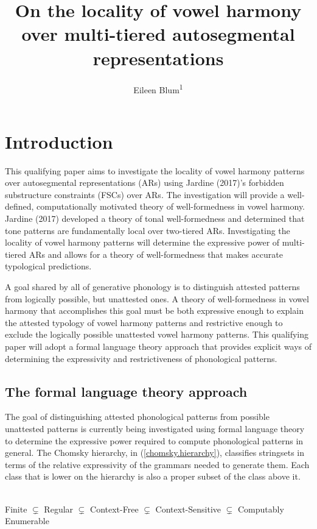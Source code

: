 \documentclass[,doc,floatsintext]{apa6}
\title{On the locality of vowel harmony over multi-tiered autosegmental
representations}
\author{Eileen Blum\textsuperscript{1}}
\date{}
\affiliation{
\vspace{0.5cm}
\textsuperscript{1} Rutgers University}
\theoremstyle{definition}
\theoremstyle{definition}
\theoremstyle{definition}
\theoremstyle{remark}
\begin{document}
\maketitle

\section{Introduction}\label{introduction}

This qualifying paper aims to investigate the locality of vowel harmony
patterns over autosegmental representations (ARs) using Jardine (2017)'s
forbidden substructure constraints (FSCs) over ARs. The investigation
will provide a well-defined, computationally motivated theory of
well-formedness in vowel harmony. Jardine (2017) developed a theory of
tonal well-formedness and determined that tone patterns are
fundamentally local over two-tiered ARs. Investigating the locality of
vowel harmony patterns will determine the expressive power of
multi-tiered ARs and allows for a theory of well-formedness that makes
accurate typological predictions.

A goal shared by all of generative phonology is to distinguish attested
patterns from logically possible, but unattested ones. A theory of
well-formedness in vowel harmony that accomplishes this goal must be
both expressive enough to explain the attested typology of vowel harmony
patterns and restrictive enough to exclude the logically possible
unattested vowel harmony patterns. This qualifying paper will adopt a
formal language theory approach that provides explicit ways of
determining the expressivity and restrictiveness of phonological
patterns.

\subsection{The formal language theory
approach}\label{the-formal-language-theory-approach}

The goal of distinguishing attested phonological patterns from possible
unattested patterns is currently being investigated using formal
language theory to determine the expressive power required to compute
phonological patterns in general. The Chomsky hierarchy, in
(\ref{chomsky.hierarchy}), classifies stringsets in terms of the
relative expressivity of the grammars needed to generate them. Each
class that is lower on the hierarchy is also a proper subset of the
class above it.

\begin{exe}
\label{chomsky.hierarchy} \\ 
Finite $\subsetneq$ Regular $\subsetneq$ Context-Free $\subsetneq$ Context-Sensitive $\subsetneq$ Computably Enumerable
\end{exe}
\end{document}
